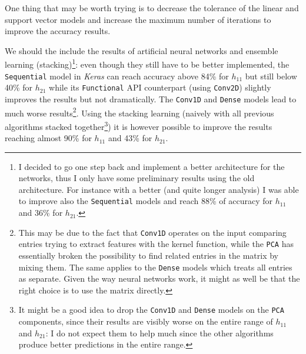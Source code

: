 One thing that may be worth trying is to decrease the tolerance of the linear and support vector models and increase the maximum number of iterations to improve the accuracy results.

We should the include the results of artificial neural networks and ensemble learning (stacking)\footnote{I decided to go one step back and implement a better architecture for the networks, thus I only have some preliminary results using the old architecture. For instance with a better (and quite longer analysis) I was able to improve also the \texttt{Sequential} models and reach 88\% of accuracy for $h_{11}$ and 36\% for $h_{21}$.}: even though they still have to be better implemented, the \texttt{Sequential} model in \textit{Keras} can reach accuracy above 84\% for $h_{11}$ but still below 40\% for $h_{21}$ while its \texttt{Functional} API counterpart (using \texttt{Conv2D}) slightly improves the results but not dramatically. The \texttt{Conv1D} and \texttt{Dense} models lead to much worse results\footnote{This may be due to the fact that \texttt{Conv1D} operates on the input comparing entries trying to extract features with the kernel function, while the \texttt{PCA} has essentially broken the possibility to find related entries in the matrix by mixing them. The same applies to the \texttt{Dense} models which treats all entries as separate. Given the way neural networks work, it might as well be that the right choice is to use the matrix directly.}. Using the stacking learning (naively with all previous algorithms stacked together\footnote{It  might be a good idea to drop the \texttt{Conv1D} and \texttt{Dense} models on the \texttt{PCA} components, since their results are visibly worse on the entire range of $h_{11}$ and $h_{21}$: I do not expect them to help much since the other algorithms produce better predictions in the entire range.}) it is however possible to improve the results reaching almost 90\% for $h_{11}$ and 43\% for $h_{21}$.